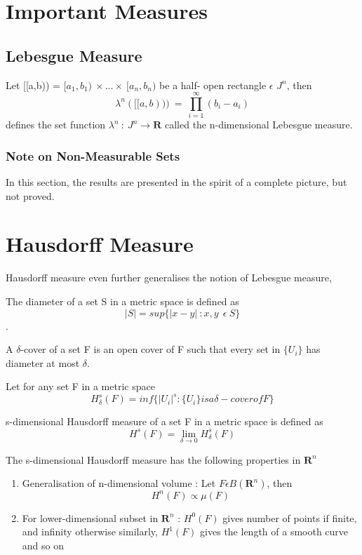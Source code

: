 \section{Important Measures}
\subsection{Lebesgue Measure}
\begin{definition}
    Let [[a,b)) = $[a_1,b_1) \: \times...\times \: [a_n,b_n)$ be a half- open
    rectangle $\epsilon$ $J^n$, then
    \[
        \lambda^n([[a,b))) \: = \: \prod_{i=1}^{\infty}(b_i - a_i)
    \]
        defines the set function $\lambda^n \: : \: J^n \rightarrow \bm{R}$
        called the n-dimensional Lebesgue measure.
\end{definition}

\subsubsection{Note on Non-Measurable Sets}
In this section, the results are presented in the spirit of a complete picture,
but not proved.


\section{Hausdorff Measure}
Hausdorff measure even further generalises the notion of Lebesgue measure,
\begin{definition}
    The diameter of a set S in a metric space is defined as
    \[
        |S| = sup\{|x-y| \: : x,y \:  \: \epsilon \: S \}
    \]
    .
\end{definition}
\begin{definition}
    A $\delta$-cover of a set F is an open cover of F such that every set in
    $\{U_i\}$ has diameter at most $\delta$.
\end{definition}
Let for any set F in a metric space
\[
    H_\delta^s(F) = inf\{|U_i|^s : \{U_i\} is a \delta-cover of F\}
\]
\begin{definition}
    s-dimensional Hausdorff measure of a set F in a metric space is defined as
    \[
        H^s(F) = \lim_{\delta \to 0} H_\delta^s(F)
    \]
\end{definition}
\begin{theorem}
    The s-dimensional Hausdorff measure has the following properties in
    $\bm{R}^n$
    \begin{enumerate}
        \item Generalisation of n-dimensional volume : Let $F \epsilon
            B(\bm{R}^n)$, then
            \[
                H^n(F) \propto \mu(F)
            \]
        \item For lower-dimensional subset in $\bm{R}^n$ : $H^0(F)$ gives number
            of points if finite, and infinity otherwise
            \newline similarly, $H^1(F)$ gives the length of a smooth curve
            \newline and so on
    \end{enumerate}
\end{theorem}

